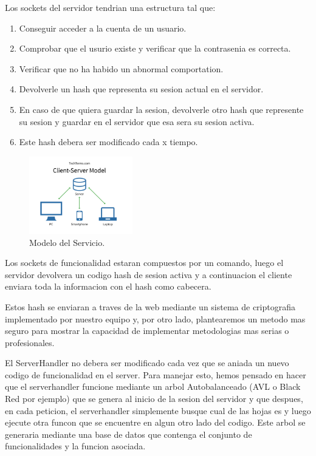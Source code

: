\documentclass{article}
\theoremstyle{definition}
\begin{document}
Los sockets del servidor tendrian una estructura tal que:
\begin{enumerate}
    \item Conseguir acceder a la cuenta de un usuario.
    \item Comprobar que el usurio existe y verificar que la contrasenia es correcta.
    \item Verificar que no ha habido un abnormal comportation.
    \item Devolverle un hash que representa su sesion actual en el servidor.
    \item En caso de que quiera guardar la sesion, devolverle otro hash que represente su sesion y guardar en el servidor que esa sera su sesion activa.
    \item Este hash debera ser modificado cada x tiempo.
\end{enumerate}

\begin{figure}
\centering
\includegraphics[width=0.4\textwidth]{pics/serverclient.png}
\caption{Modelo del Servicio.}
\end{figure} 

Los sockets de funcionalidad estaran compuestos por un comando, luego el servidor devolvera un codigo hash de sesion activa y a continuacion el cliente enviara toda la informacion con el hash como cabecera.

Estos hash se enviaran a traves de la web mediante un sistema de criptografia implementado por nuestro equipo y, por otro lado, plantearemos un metodo mas seguro para mostrar la capacidad de implementar metodologias mas serias o profesionales.

El ServerHandler no debera ser modificado cada vez que se aniada un nuevo codigo de funcionalidad en el server. Para manejar esto, hemos pensado en hacer que el serverhandler funcione mediante un arbol Autobalanceado (AVL o Black Red por ejemplo) que se genera al inicio de la sesion del servidor y que despues, en cada peticion, el serverhandler simplemente busque cual de las hojas es y luego ejecute otra funcon que se encuentre en algun otro lado del codigo. Este arbol se generaria mediante una base de datos que contenga el conjunto de funcionalidades y la funcion asociada.
\end{document}
